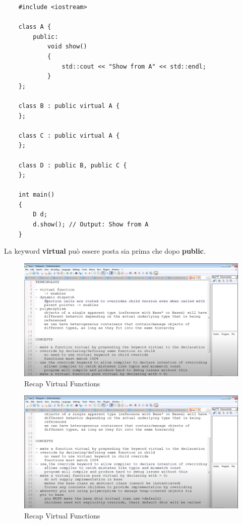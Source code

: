 \begin{lstlisting}
	#include <iostream>
	
	class A {
		public:
			void show()
			{
				std::cout << "Show from A" << std::endl;
			}
	};

	class B : public virtual A {
	};

	class C : public virtual A {
	};

	class D : public B, public C {
	};

	int main()
	{
		D d;
		d.show(); // Output: Show from A
	}
\end{lstlisting}

\textsf{\small La keyword \textbf{virtual} può essere posta sia prima che dopo \textbf{public}.} \\

\begin{figure}[H]
	\centering
	\includegraphics[width=1\textwidth, height=1\textheight, keepaspectratio]{./imgs/virtual_functions_recap_terminology_and_concepts1.png}
	\caption{Recap Virtual Functions}
	\label{fig:virtual_functions_recap_terminology_and_concepts1}
\end{figure}

\begin{figure}[H]
	\centering
	\includegraphics[width=1\textwidth, height=1\textheight, keepaspectratio]{./imgs/virtual_functions_recap_terminology_and_concepts2.png}
	\caption{Recap Virtual Functions}
	\label{fig:virtual_functions_recap_terminology_and_concepts2}
\end{figure}

